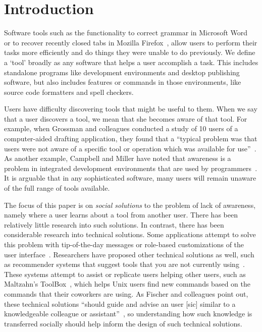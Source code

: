\documentclass[smallextended]{svjour3}
\begin{document}
\section{Introduction}\label{sec:intro}

\noindent
Software tools such as the functionality to correct grammar in Microsoft
Word~\cite{word} or to recover recently closed tabs in Mozilla Firefox~\cite{firefox}, allow users to 
perform their tasks more efficiently and do things they were unable to do
previously.
We define a `tool' broadly as any software that helps a user accomplish a task.
This includes standalone programs like development environments 
and desktop publishing software,
but also includes features or commands in those environments, 
like source code formatters and spell checkers.

Users have difficulty discovering tools that might be
useful to them.
When we say that a user discovers a tool, we mean that she becomes
aware of that tool.
For example, when Grossman and colleagues conducted a study of 10 users of
a computer-aided drafting application, they found that a ``typical problem was
that users were not aware of a specific tool or operation which was available for
use''~\cite{grossman09}.
As another example, Campbell and Miller have noted that awareness is a problem
in integrated development environments that are used by
programmers~\cite{campbell08}. 
It is arguable that in any sophisticated software, many
users will remain unaware of the full range of tools available.

The focus of this paper is on \emph{social solutions} to the problem of lack of
awareness, namely where a user learns about a tool from another user. 
There has been relatively little research into such solutions. 
In contrast, there has been
considerable research into technical solutions.
Some applications attempt to solve this problem with tip-of-the-day messages or
role-based customizations of the user interface~\cite{findlater08}.
Researchers have proposed other technical solutions as well,
such as recommender systems that suggest tools that you are not currently 
using~\cite{linton,maltzahn,matejka09}.
These systems attempt to assist or replicate users helping other users, 
such as Maltzahn's ToolBox~\cite{maltzahn}, which helps Unix users find new commands based on the
commands that their coworkers are using.
As Fischer and colleagues point out, these technical solutions ``should guide
and advise an user [sic] similar to a knowledgeable colleague or
assistant''~\cite[p.~115]{fischer84}, so understanding how such knowledge is
transferred socially should help inform the design of such technical solutions.
\end{document}

